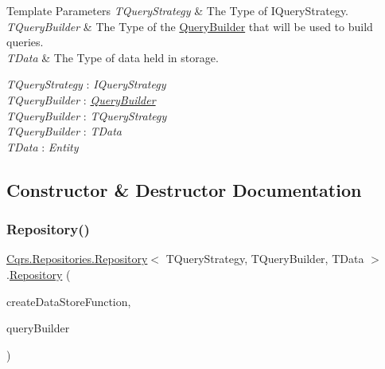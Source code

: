 \begin{DoxyTemplParams}{Template Parameters}
{\em T\+Query\+Strategy} & The Type of I\+Query\+Strategy.\\
\hline
{\em T\+Query\+Builder} & The Type of the \hyperlink{classCqrs_1_1Repositories_1_1Repository_a4447451b7dbcfcd68dfa3fa65a41f357_a4447451b7dbcfcd68dfa3fa65a41f357}{Query\+Builder} that will be used to build queries.\\
\hline
{\em T\+Data} & The Type of data held in storage.\\
\hline
\end{DoxyTemplParams}
\begin{Desc}
\item[Type Constraints]\begin{description}
\item[{\em T\+Query\+Strategy} : {\em I\+Query\+Strategy}]\item[{\em T\+Query\+Builder} : {\em \hyperlink{classCqrs_1_1Repositories_1_1Repository_a4447451b7dbcfcd68dfa3fa65a41f357_a4447451b7dbcfcd68dfa3fa65a41f357}{Query\+Builder}}]\item[{\em T\+Query\+Builder} : {\em T\+Query\+Strategy}]\item[{\em T\+Query\+Builder} : {\em T\+Data}]\item[{\em T\+Data} : {\em Entity}]\end{description}
\end{Desc}


\subsection{Constructor \& Destructor Documentation}
\mbox{\label{classCqrs_1_1Repositories_1_1Repository_a2f4009847fa03a897c6698fd5a92d89f_a2f4009847fa03a897c6698fd5a92d89f}} 
\subsubsection{\texorpdfstring{Repository()}{Repository()}}
{\footnotesize\ttfamily \hyperlink{classCqrs_1_1Repositories_1_1Repository}{Cqrs.\+Repositories.\+Repository}$<$ T\+Query\+Strategy, T\+Query\+Builder, T\+Data $>$.\hyperlink{classCqrs_1_1Repositories_1_1Repository}{Repository} (\begin{DoxyParamCaption}\item[{Func$<$ \hyperlink{interfaceCqrs_1_1DataStores_1_1IDataStore}{I\+Data\+Store}$<$ T\+Data $>$$>$}]{create\+Data\+Store\+Function,  }\item[{T\+Query\+Builder}]{query\+Builder }\end{DoxyParamCaption})\hspace{0.3cm}{\ttfamily [protected]}}



